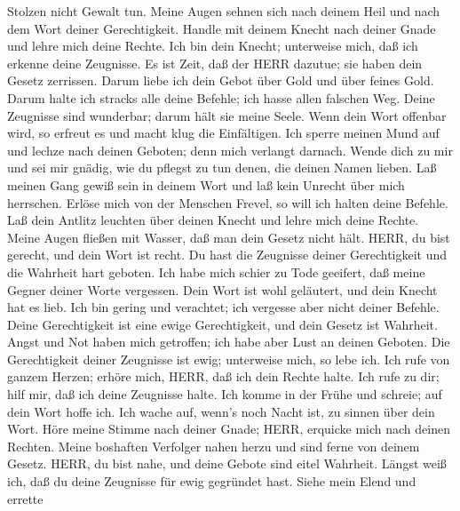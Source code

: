 Stolzen nicht Gewalt tun.  Meine Augen sehnen sich nach
deinem Heil und nach dem Wort deiner Gerechtigkeit. 
Handle mit deinem Knecht nach deiner Gnade und lehre mich deine Rechte.
 Ich bin dein Knecht; unterweise mich, daß ich erkenne
deine Zeugnisse.  Es ist Zeit, daß der HERR dazutue; sie
haben dein Gesetz zerrissen.  Darum liebe ich dein Gebot
über Gold und über feines Gold.  Darum halte ich stracks
alle deine Befehle; ich hasse allen falschen Weg.  Deine
Zeugnisse sind wunderbar; darum hält sie meine Seele. 
Wenn dein Wort offenbar wird, so erfreut es und macht klug die
Einfältigen.  Ich sperre meinen Mund auf und lechze nach
deinen Geboten; denn mich verlangt darnach.  Wende dich zu
mir und sei mir gnädig, wie du pflegst zu tun denen, die deinen Namen
lieben.  Laß meinen Gang gewiß sein in deinem Wort und laß
kein Unrecht über mich herrschen.  Erlöse mich von der
Menschen Frevel, so will ich halten deine Befehle.  Laß
dein Antlitz leuchten über deinen Knecht und lehre mich deine Rechte.
 Meine Augen fließen mit Wasser, daß man dein Gesetz nicht
hält.  HERR, du bist gerecht, und dein Wort ist recht.
 Du hast die Zeugnisse deiner Gerechtigkeit und die
Wahrheit hart geboten.  Ich habe mich schier zu Tode
geeifert, daß meine Gegner deiner Worte vergessen.  Dein
Wort ist wohl geläutert, und dein Knecht hat es lieb.  Ich
bin gering und verachtet; ich vergesse aber nicht deiner Befehle.
 Deine Gerechtigkeit ist eine ewige Gerechtigkeit, und
dein Gesetz ist Wahrheit.  Angst und Not haben mich
getroffen; ich habe aber Lust an deinen Geboten.  Die
Gerechtigkeit deiner Zeugnisse ist ewig; unterweise mich, so lebe ich.
 Ich rufe von ganzem Herzen; erhöre mich, HERR, daß ich
dein Rechte halte.  Ich rufe zu dir; hilf mir, daß ich
deine Zeugnisse halte.  Ich komme in der Frühe und
schreie; auf dein Wort hoffe ich.  Ich wache auf, wenn's
noch Nacht ist, zu sinnen über dein Wort.  Höre meine
Stimme nach deiner Gnade; HERR, erquicke mich nach deinen Rechten.
 Meine boshaften Verfolger nahen herzu und sind ferne von
deinem Gesetz.  HERR, du bist nahe, und deine Gebote sind
eitel Wahrheit.  Längst weiß ich, daß du deine Zeugnisse
für ewig gegründet hast.  Siehe mein Elend und errette
